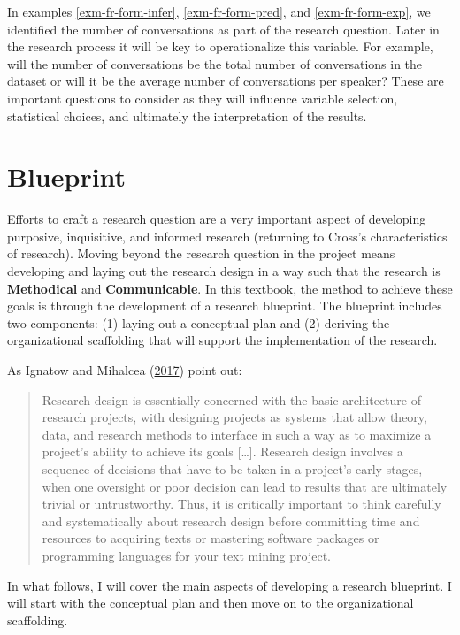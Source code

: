 \documentclass[
  letterpaper,
  DIV=11,
  numbers=noendperiod]{scrreport}
\theoremstyle{definition}
\theoremstyle{remark}
\begin{document}
In examples \ref{exm-fr-form-infer}, \ref{exm-fr-form-pred}, and
\ref{exm-fr-form-exp}, we identified the number of conversations as part
of the research question. Later in the research process it will be key
to operationalize this variable. For example, will the number of
conversations be the total number of conversations in the dataset or
will it be the average number of conversations per speaker? These are
important questions to consider as they will influence variable
selection, statistical choices, and ultimately the interpretation of the
results.

\hypertarget{sec-fr-blueprint}{%
\section{Blueprint}\label{sec-fr-blueprint}}

Efforts to craft a research question are a very important aspect of
developing purposive, inquisitive, and informed research (returning to
Cross's characteristics of research). Moving beyond the research
question in the project means developing and laying out the research
design in a way such that the research is \textbf{Methodical} and
\textbf{Communicable}. In this textbook, the method to achieve these
goals is through the development of a research blueprint. The blueprint
includes two components: (1) laying out a conceptual plan and (2)
deriving the organizational scaffolding that will support the
implementation of the research.

As Ignatow and Mihalcea (\protect\hyperlink{ref-Ignatow2017}{2017})
point out:

\begin{quote}
Research design is essentially concerned with the basic architecture of
research projects, with designing projects as systems that allow theory,
data, and research methods to interface in such a way as to maximize a
project's ability to achieve its goals {[}\ldots{]}. Research design
involves a sequence of decisions that have to be taken in a project's
early stages, when one oversight or poor decision can lead to results
that are ultimately trivial or untrustworthy. Thus, it is critically
important to think carefully and systematically about research design
before committing time and resources to acquiring texts or mastering
software packages or programming languages for your text mining project.
\end{quote}

In what follows, I will cover the main aspects of developing a research
blueprint. I will start with the conceptual plan and then move on to the
organizational scaffolding.
\end{document}
